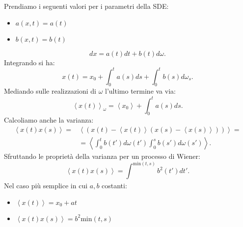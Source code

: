 \noindent
\begin{exmp}[]
    Prendiamo i seguenti valori per i parametri della SDE:
    \begin{itemize}
        \item $a(x,t) = a(t)$
	\item $b(x,t) = b(t)$
    \end{itemize}
    \[
	dx = a(t)dt + b(t) d\omega
    .\] 
    Integrando si ha: 
    \[
	x(t) = x_0 + \int_{0}^{t} a(s) ds + \int_{0}^{t} b(s) d\omega_s 
    .\] 
    Mediando sulle realizzazioni di $\omega$ l'ultimo termine va via:
    \[
	\left<x(t) \right>_\omega = \left<x_0\right>+\int_{0}^{t} a(s) ds 
    .\] 
    Calcoliamo anche la varianza:
    \[\begin{aligned}
	\left<x(t) x(s) \right> =& \left<\left(x(t) - \left<x(t)\right>\left(x(s) - \left<x(s)\right>\right)\right)\right> = \\
				 & = \left<\int_{0}^{t} b(t') d\omega(t') \int_{0}^{s} b(s') d\omega (s')\right>
    .\end{aligned}\]
    Sfruttando le proprietà della varianza per un processo di Wiener:
    \[
	\left<x(t) x(s) \right> = \int_{}^{\text{min}(t,s)} b^2(t') dt'
    .\] 
    Nel caso più semplice in cui $a, b$ costanti:
    \begin{itemize}
	\item $\left<x(t)\right>=x_0+at$ 
	\item $\left<x(t) x(s)\right> = b^2 \text{min}(t,s)$ 
    \end{itemize}
\end{exmp}
\noindent
